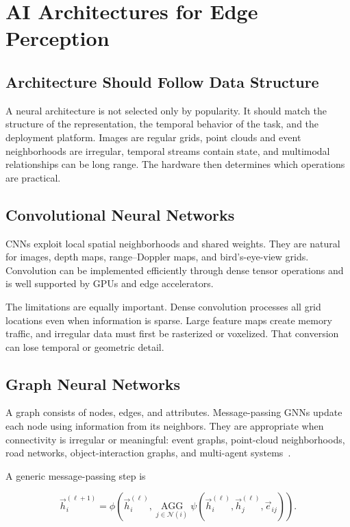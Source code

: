 \chapter{AI Architectures for Edge Perception}
\label{chap:ai-architectures}

\section{Architecture Should Follow Data Structure}

A neural architecture is not selected only by popularity. It should match the structure of the representation, the temporal behavior of the task, and the deployment platform. Images are regular grids, point clouds and event neighborhoods are irregular, temporal streams contain state, and multimodal relationships can be long range. The hardware then determines which operations are practical.

\section{Convolutional Neural Networks}

CNNs exploit local spatial neighborhoods and shared weights. They are natural for images, depth maps, range--Doppler maps, and bird's-eye-view grids. Convolution can be implemented efficiently through dense tensor operations and is well supported by GPUs and edge accelerators.

The limitations are equally important. Dense convolution processes all grid locations even when information is sparse. Large feature maps create memory traffic, and irregular data must first be rasterized or voxelized. That conversion can lose temporal or geometric detail.

\section{Graph Neural Networks}

A graph consists of nodes, edges, and attributes. Message-passing GNNs update each node using information from its neighbors. They are appropriate when connectivity is irregular or meaningful: event graphs, point-cloud neighborhoods, road networks, object-interaction graphs, and multi-agent systems~\cite{kipf2017gcn}.

A generic message-passing step is

\[
    \vec{h}_i^{(\ell+1)}
    = \phi\!\left(
        \vec{h}_i^{(\ell)},
        \operatorname*{AGG}_{j\in\mathcal{N}(i)}
        \psi(\vec{h}_i^{(\ell)},\vec{h}_j^{(\ell)},\vec{e}_{ij})
      \right).
\]

